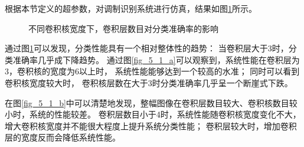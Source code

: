 根据本节定义的超参数，对调制识别系统进行仿真，结果如图\ref{fig_5_1}所示。\par
\begin{figure}[!h]
	\centering
	\caption{不同卷积核宽度下，卷积层数目对分类准确率的影响}
	\label{fig_5_1}
\end{figure}

通过图\ref{fig_5_1}可以发现，分类性能具有一个相对整体性的趋势：
当卷积层大于3时，分类准确率几乎成下降趋势。
通过图\ref{fig_5_1_a}可以观察到，系统性能在卷积层为$3$，卷积核的宽度为$6$以上时，
系统性能能够达到一个较高的水准；
同时可以看到卷积核宽度较大时，
卷积核层数在大于$3$时分类准确率几乎呈一个断崖式下跌。\par

在图\ref{fig_5_1_b}中可以清楚地发现，整幅图像在卷积层数目较大、卷积核数目较小时，系统的性能较差。
卷积层数目小于4时，系统性能随卷积核宽度变化不大，增大卷积核宽度并不能很大程度上提升系统分类性能；
卷积层较大时，增加卷积层的宽度反而会降低系统性能。\par

